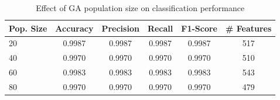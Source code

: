\begin{table}[htbp]
\centering
\caption{Effect of GA population size on classification performance}
\label{tab:table11}
\begin{tabular}{lccccc}
\toprule
Pop. Size & Accuracy & Precision & Recall & F1-Score & \# Features \\
\midrule
20 & 0.9987 & 0.9987 & 0.9987 & 0.9987 & 517 \\
40 & 0.9970 & 0.9970 & 0.9970 & 0.9970 & 510 \\
60 & 0.9983 & 0.9983 & 0.9983 & 0.9983 & 543 \\
80 & 0.9970 & 0.9970 & 0.9970 & 0.9970 & 479 \\
\bottomrule
\end{tabular}
\end{table}